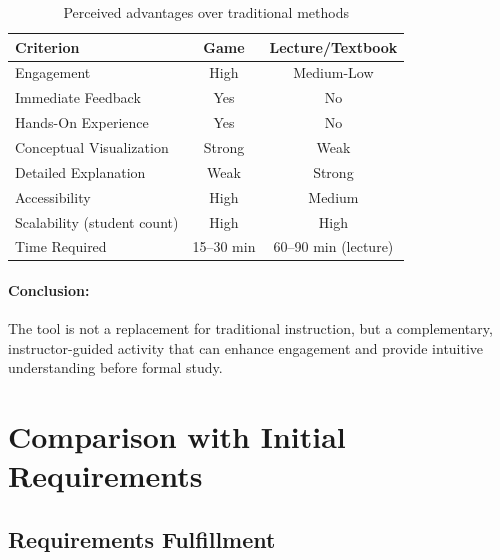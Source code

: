 \begin{table}[htbp]
    \centering
    \caption{Perceived advantages over traditional methods}
    \label{tab:comparison-traditional}
    \begin{tabular}{@{}lcc@{}}
        \toprule
        \textbf{Criterion}          & \textbf{Game} & \textbf{Lecture/Textbook} \\
        \midrule
        Engagement                  & High          & Medium-Low                \\
        Immediate Feedback          & Yes           & No                        \\
        Hands-On Experience         & Yes           & No                        \\
        Conceptual Visualization    & Strong        & Weak                      \\
        Detailed Explanation        & Weak          & Strong                    \\
        Accessibility               & High          & Medium                    \\
        Scalability (student count) & High          & High                      \\
        Time Required               & 15--30 min    & 60--90 min (lecture)      \\
        \bottomrule
    \end{tabular}
\end{table}

\paragraph*{Conclusion:}

The tool is not a replacement for traditional instruction, but a complementary, instructor-guided activity that can enhance engagement and provide intuitive understanding before formal study.

\section{Comparison with Initial Requirements}
\label{sec:requirements-comparison}

\subsection{Requirements Fulfillment}
\label{subsec:requirements-fulfillment}

